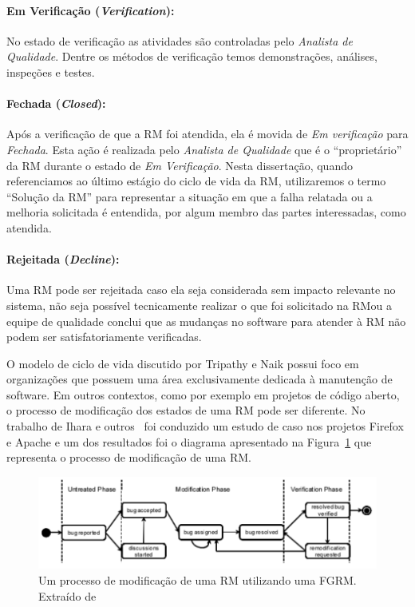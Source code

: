 \paragraph{Em Verificação (\textit{Verification}):}\label{par:em_verificacao}

No estado de verificação as atividades são controladas pelo \textit{Analista de
Qualidade}. Dentre os métodos de verificação temos demonstrações, análises,
inspeções e testes.

\paragraph{Fechada (\textit{Closed}):}\label{par:fechada}

Após a verificação de que a RM foi atendida, ela é movida de \textit{Em
    verificação} para \textit{Fechada}. Esta ação é realizada pelo
\textit{Analista de Qualidade} que é o ``proprietário'' da RM durante o estado
de \textit{Em Verificação}. Nesta dissertação, quando referenciamos ao último
estágio do ciclo de vida da RM, utilizaremos o termo ``Solução da RM'' para
representar a situação em que a falha relatada ou a melhoria solicitada é
entendida, por algum membro das partes interessadas, como atendida.

\paragraph{Rejeitada (\textit{Decline}):}\label{par:rejeitada}

Uma RM pode ser rejeitada caso ela seja considerada sem impacto relevante no
sistema, não seja possível tecnicamente realizar o que foi solicitado na RM\@ ou
a equipe de qualidade conclui que as mudanças no software para atender à RM não
podem ser satisfatoriamente verificadas.

O modelo de ciclo de vida discutido por Tripathy e Naik possui foco em
organizações que possuem uma área exclusivamente dedicada à manutenção de
software. Em outros contextos, como por exemplo em projetos de código aberto, o
processo de modificação dos estados de uma RM pode ser diferente. No trabalho de
Ihara e outros~\cite{ihara2009analysis} foi conduzido um estudo de caso nos
projetos Firefox e Apache e um dos resultados foi o diagrama apresentado na
Figura~\ref{fig:diagrama-estado-rm-codigo-aberto} que representa o processo de
modificação de uma RM\@.

\begin{figure}[htpb]
	\centering
    \includegraphics[width=0.8\linewidth]{./chapter-manutencao-software-visao-geral/img/diagrama-estado-rm-codigo-aberto.pdf}
    \caption{Um processo de modificação de uma RM utilizando uma FGRM\@.
        Extraído de~\cite{ihara2009analysis}}\label{fig:diagrama-estado-rm-codigo-aberto}
\end{figure}

